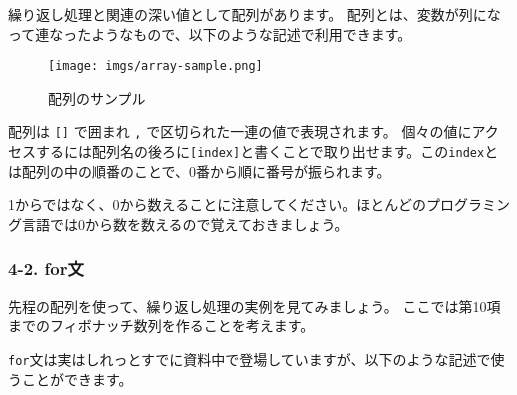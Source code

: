 繰り返し処理と関連の深い値として配列があります。
配列とは、変数が列になって連なったようなもので、以下のような記述で利用できます。

\begin{Shaded}
\begin{Highlighting}[]
\OperatorTok{=}\NormalTok{ [}\OperatorTok{,} \OperatorTok{,} \OperatorTok{,} \OperatorTok{,} \NormalTok{]}\OperatorTok{;}
\NormalTok{(array[}\NormalTok{])}\OperatorTok{;} 
\NormalTok{(array[}\NormalTok{])}\OperatorTok{;} 
\end{Highlighting}
\end{Shaded}

\begin{figure}
\centering
\texttt{[image: imgs/array-sample.png]}
\caption{配列のサンプル}
\end{figure}

配列は \texttt{{[}{]}} で囲まれ \texttt{,}
で区切られた一連の値で表現されます。
個々の値にアクセスするには配列名の後ろに\texttt{{[}index{]}}と書くことで取り出せます。この\texttt{index}とは配列の中の順番のことで、0番から順に番号が振られます。

1からではなく、0から数えることに注意してください。ほとんどのプログラミング言語では0から数を数えるので覚えておきましょう。

\subsubsection{4-2. for文}\label{forux6587}

先程の配列を使って、繰り返し処理の実例を見てみましょう。
ここでは第10項までのフィボナッチ数列を作ることを考えます。

\texttt{for}文は実はしれっとすでに資料中で登場していますが、以下のような記述で使うことができます。

\begin{Shaded}
\begin{Highlighting}[]
\NormalTok{ (}\OperatorTok{\textless{}}\OperatorTok{\textgreater{};} \OperatorTok{\textless{}}\OperatorTok{\textgreater{};} \OperatorTok{\textless{}}\OperatorTok{\textgreater{}}\NormalTok{) \{}
  \OperatorTok{\textless{}}\OperatorTok{\textgreater{}}
\NormalTok{\}}
\end{Highlighting}
\end{Shaded}

